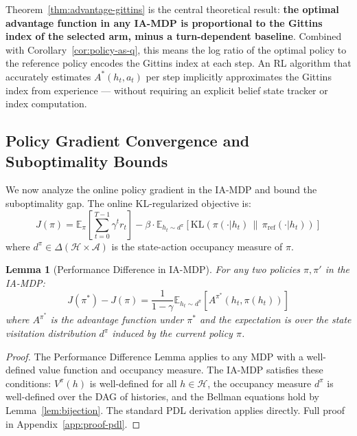 \documentclass[11pt]{article}
\theoremstyle{plain}
\newtheorem{lemma}[theorem]{Lemma}
\theoremstyle{definition}
\theoremstyle{remark}
\begin{document}
Theorem~\ref{thm:advantage-gittins} is the central theoretical 
result: \textbf{the optimal advantage function in any IA-MDP 
is proportional to the Gittins index of the selected arm, 
minus a turn-dependent baseline}. Combined with 
Corollary~\ref{cor:policy-as-q}, this means the log ratio of 
the optimal policy to the reference policy encodes the Gittins 
index at each step. An RL algorithm that accurately estimates 
$A^*(h_t, a_t)$ per step implicitly approximates the Gittins 
index from experience — without requiring an explicit belief 
state tracker or index computation.

\subsection{Policy Gradient Convergence and Suboptimality Bounds}

We now analyze the online policy gradient in the IA-MDP and 
bound the suboptimality gap. The online KL-regularized objective 
is:
$$J(\pi) = \mathbb{E}_\pi\!\left[\sum_{t=0}^{T-1} \gamma^t r_t\right] 
- \beta \cdot \mathbb{E}_{h_t \sim d^\pi}\!\left[
\mathrm{KL}(\pi(\cdot|h_t) \,\|\, \pi_\mathrm{ref}(\cdot|h_t))
\right]$$
where $d^\pi \in \Delta(\mathcal{H} \times \mathcal{A})$ is the 
state-action occupancy measure of $\pi$.

\begin{lemma}[Performance Difference in IA-MDP]
\label{lem:pdl}
For any two policies $\pi, \pi'$ in the IA-MDP:
$$J(\pi^*) - J(\pi) = 
\frac{1}{1-\gamma} \mathbb{E}_{h_t \sim d^\pi}
\!\left[A^{\pi^*}(h_t, \pi(h_t))\right]$$
where $A^{\pi^*}$ is the advantage function under $\pi^*$ and 
the expectation is over the state visitation distribution 
$d^\pi$ induced by the current policy $\pi$.
\end{lemma}

\begin{proof}
The Performance Difference Lemma \citep{kakade2002approximately} 
applies to any MDP with a well-defined value function and 
occupancy measure. The IA-MDP satisfies these conditions: 
$V^\pi(h)$ is well-defined for all $h \in \mathcal{H}$, the 
occupancy measure $d^\pi$ is well-defined over the DAG of 
histories, and the Bellman equations hold by 
Lemma~\ref{lem:bijection}. The standard PDL derivation applies 
directly.
Full proof in Appendix~\ref{app:proof-pdl}.
\end{proof}
\end{document}
